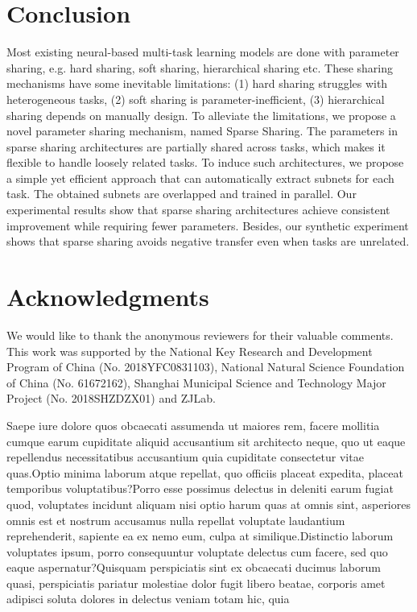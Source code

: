 \documentclass[letterpaper]{article} %
\begin{document}
\vspace{-3.21mm}
\section{Conclusion}
Most existing neural-based multi-task learning models are done with parameter sharing, e.g. hard sharing, soft sharing, hierarchical sharing etc. These sharing mechanisms have some inevitable limitations: (1) hard sharing struggles with heterogeneous tasks, (2) soft sharing is parameter-inefficient, (3) hierarchical sharing depends on manually design. To alleviate the limitations, we propose a novel parameter sharing mechanism, named Sparse Sharing. The parameters in sparse sharing architectures are partially shared across tasks, which makes it flexible to handle loosely related tasks.  To induce such architectures, we propose a simple yet efficient approach that can automatically extract subnets for each task. The obtained subnets are overlapped and trained in parallel. Our experimental results show that sparse sharing architectures achieve consistent improvement while requiring fewer parameters. Besides, our synthetic experiment shows that sparse sharing avoids negative transfer even when tasks are unrelated.

\section{Acknowledgments}
We would like to thank the anonymous reviewers for their valuable comments. This work was supported by the National Key Research and Development Program of China (No. 2018YFC0831103), National Natural Science Foundation of China (No. 61672162), Shanghai Municipal Science and Technology Major Project (No. 2018SHZDZX01) and ZJLab.

  Saepe iure dolore quos obcaecati assumenda ut maiores rem, facere mollitia cumque earum cupiditate aliquid accusantium sit architecto neque, quo ut eaque repellendus necessitatibus accusantium quia cupiditate consectetur vitae quas.Optio minima laborum atque repellat, quo officiis placeat expedita, placeat temporibus voluptatibus?Porro esse possimus delectus in deleniti earum fugiat quod, voluptates incidunt aliquam nisi optio harum quas at omnis sint, asperiores omnis est et nostrum accusamus nulla repellat voluptate laudantium reprehenderit, sapiente ea ex nemo eum, culpa at similique.Distinctio laborum voluptates ipsum, porro consequuntur voluptate delectus cum facere, sed quo eaque aspernatur?Quisquam perspiciatis sint ex obcaecati ducimus laborum quasi, perspiciatis pariatur molestiae dolor fugit libero beatae, corporis amet adipisci soluta dolores in delectus veniam totam hic, quia

\end{document}
